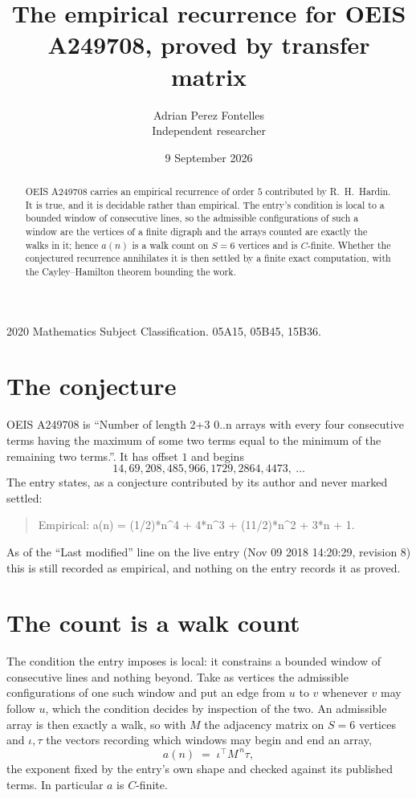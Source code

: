 \documentclass[11pt,a4paper]{article}
\title{The empirical recurrence for OEIS A249708, proved by transfer matrix}
\author{Adrian Perez Fontelles\\ \small Independent researcher}
\date{9 September 2026}
\theoremstyle{plain}
\theoremstyle{definition}
\begin{document}
\maketitle

\begin{abstract}
OEIS A249708 carries an empirical recurrence of order $5$ contributed by R.~H.~Hardin. It is
true, and it is decidable rather than empirical. The entry's condition is local to a bounded window of consecutive lines, so
the admissible configurations of such a window are the vertices of a finite digraph and the
arrays counted are exactly the walks in it; hence $a(n)$ is a walk count on $S=6$ vertices
and is $C$-finite. Whether the conjectured recurrence annihilates it is then settled by a
finite exact computation, with the Cayley--Hamilton theorem bounding the work.
\end{abstract}

\noindent\small 2020 Mathematics Subject Classification. 05A15, 05B45, 15B36.\normalsize

\section{The conjecture}

OEIS A249708 is ``Number of length 2+3 0..n arrays with every four consecutive terms having the maximum of some two terms equal to the minimum of the remaining two terms.''. It has offset $1$ and begins
\[
14, 69, 208, 485, 966, 1729, 2864, 4473,\ \dots
\]
The entry states, as a conjecture contributed by its author and never marked settled:
\begin{quote}
Empirical: a(n) = (1/2)*n\^{}4 + 4*n\^{}3 + (11/2)*n\^{}2 + 3*n + 1.
\end{quote}
As of the ``Last modified'' line on the live entry (Nov 09 2018 14:20:29, revision 8) this is still
recorded as empirical, and nothing on the entry records it as proved.

\section{The count is a walk count}

The condition the entry imposes is local: it constrains a bounded window of consecutive lines and nothing beyond. Take as
vertices the admissible configurations of one such window and put an edge from $u$ to $v$
whenever $v$ may follow $u$, which the condition decides by inspection of the two. An
admissible array is then exactly a walk, so with $M$ the adjacency matrix on $S=6$ vertices
and $\iota,\tau$ the vectors recording which windows may begin and end an array,
\[
a(n)\;=\;\iota^{\!\top}M^{\,n}\tau ,
\]
the exponent fixed by the entry's own shape and checked against its published terms. In
particular $a$ is $C$-finite.
\end{document}
